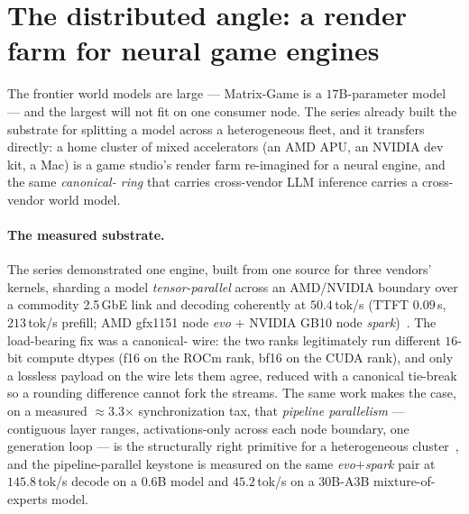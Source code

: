\documentclass[11pt]{article}
\begin{document}
\section{The distributed angle: a render farm for neural game engines}
\label{sec:distributed}

The frontier world models are large --- Matrix-Game is a $17$B-parameter model~\cite{matrixgame} --- and the
largest will not fit on one consumer node. The series already built the substrate for splitting a model across
a heterogeneous fleet, and it transfers directly: a home cluster of mixed accelerators (an AMD APU, an NVIDIA
dev kit, a Mac) is a game studio's render farm re-imagined for a neural engine, and the same
\emph{canonical- ring} that carries cross-vendor LLM inference carries a cross-vendor world model.

\paragraph{The measured substrate.} The series demonstrated one engine, built from one source for three
vendors' kernels, sharding a model \emph{tensor-parallel} across an AMD/NVIDIA boundary over a commodity
2.5\,GbE link and decoding coherently at $50.4$\,tok/s (TTFT $0.09$\,s, $213$\,tok/s prefill; AMD gfx1151
node \emph{evo} $+$ NVIDIA GB10 node \emph{spark})~\cite{het}. The load-bearing fix was a canonical-
wire: the two ranks legitimately run different $16$-bit compute dtypes (f16 on the ROCm rank, bf16 on the CUDA
rank), and only a lossless  payload on the wire lets them agree, reduced with a canonical tie-break
so a rounding difference cannot fork the streams. The same work makes the case, on a measured $\approx$3.3$\times$
synchronization tax, that \emph{pipeline parallelism} --- contiguous layer ranges, activations-only across each
node boundary, one generation loop --- is the structurally right primitive for a heterogeneous
cluster~\cite{het,latency}, and the pipeline-parallel keystone is measured on the same \emph{evo}$+$\emph{spark}
pair at $145.8$\,tok/s decode on a $0.6$B model and $45.2$\,tok/s on a $30$B-A3B mixture-of-experts model.
\end{document}

